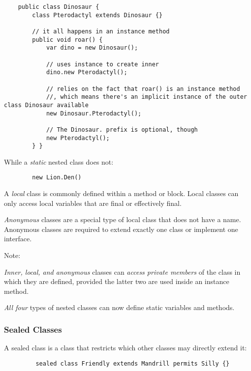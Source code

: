 \documentclass{scrartcl}
\begin{document}
    \begin{lstlisting}
    public class Dinosaur {
        class Pterodactyl extends Dinosaur {}

        // it all happens in an instance method
        public void roar() {
            var dino = new Dinosaur();

            // uses instance to create inner
            dino.new Pterodactyl();

            // relies on the fact that roar() is an instance method
            //, which means there's an implicit instance of the outer class Dinosaur available
            new Dinosaur.Pterodactyl();

            // The Dinosaur. prefix is optional, though
            new Pterodactyl();
        } }
    \end{lstlisting}

    While a \textit{static} nested class does not:

    \begin{lstlisting}
        new Lion.Den()
    \end{lstlisting}

    A \textit{local} class is commonly defined within a method or block.
    Local classes can only access local variables that are final or effectively final.

    \textit{Anonymous} classes are a special type of local class that does not have a name.
    Anonymous classes are required to extend exactly one class or implement one interface.

    Note:

    \textit{Inner, local, and anonymous} classes can \textit{access private members} of the class in which they are defined, provided the latter two are used inside an instance method.

    \textit{All four} types of nested classes can now define static variables and methods.

\subsubsection{Sealed Classes}

    A sealed class is a class that restricts which other classes may directly extend it:

    \begin{lstlisting}
         sealed class Friendly extends Mandrill permits Silly {}
    \end{lstlisting}
\end{document}
